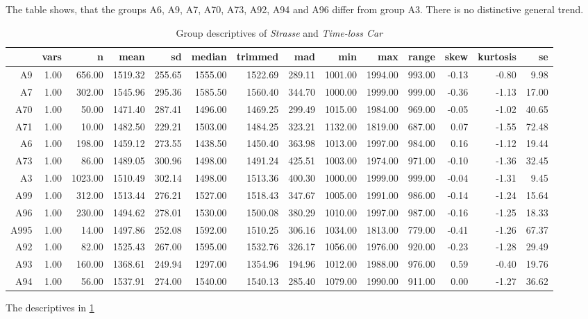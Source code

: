 The table shows, that the groups A6, A9, A7, A70, A73, A92, A94 and A96 differ from group A3. There is no distinctive general trend.
\begin{table}[ht!]
	\tiny
	\centering
	\begin{tabular}{rrrrrrrrrrrrrr}
		\hline
		& vars & n & mean & sd & median & trimmed & mad & min & max & range & skew & kurtosis & se \\ 
		\hline
		A9   & 1.00 & 656.00 & 1519.32 & 255.65 & 1555.00 & 1522.69 & 289.11 & 1001.00 & 1994.00 & 993.00 & -0.13 & -0.80 & 9.98 \\ 
		A7   & 1.00 & 302.00 & 1545.96 & 295.36 & 1585.50 & 1560.40 & 344.70 & 1000.00 & 1999.00 & 999.00 & -0.36 & -1.13 & 17.00 \\ 
		A70  & 1.00 & 50.00 & 1471.40 & 287.41 & 1496.00 & 1469.25 & 299.49 & 1015.00 & 1984.00 & 969.00 & -0.05 & -1.02 & 40.65 \\ 
		A71  & 1.00 & 10.00 & 1482.50 & 229.21 & 1503.00 & 1484.25 & 323.21 & 1132.00 & 1819.00 & 687.00 & 0.07 & -1.55 & 72.48 \\ 
		A6   & 1.00 & 198.00 & 1459.12 & 273.55 & 1438.50 & 1450.40 & 363.98 & 1013.00 & 1997.00 & 984.00 & 0.16 & -1.12 & 19.44 \\ 
		A73  & 1.00 & 86.00 & 1489.05 & 300.96 & 1498.00 & 1491.24 & 425.51 & 1003.00 & 1974.00 & 971.00 & -0.10 & -1.36 & 32.45 \\ 
		A3   & 1.00 & 1023.00 & 1510.49 & 302.14 & 1498.00 & 1513.36 & 400.30 & 1000.00 & 1999.00 & 999.00 & -0.04 & -1.31 & 9.45 \\ 
		A99  & 1.00 & 312.00 & 1513.44 & 276.21 & 1527.00 & 1518.43 & 347.67 & 1005.00 & 1991.00 & 986.00 & -0.14 & -1.24 & 15.64 \\ 
		A96  & 1.00 & 230.00 & 1494.62 & 278.01 & 1530.00 & 1500.08 & 380.29 & 1010.00 & 1997.00 & 987.00 & -0.16 & -1.25 & 18.33 \\ 
		A995 & 1.00 & 14.00 & 1497.86 & 252.08 & 1592.00 & 1510.25 & 306.16 & 1034.00 & 1813.00 & 779.00 & -0.41 & -1.26 & 67.37 \\ 
		A92  & 1.00 & 82.00 & 1525.43 & 267.00 & 1595.00 & 1532.76 & 326.17 & 1056.00 & 1976.00 & 920.00 & -0.23 & -1.28 & 29.49 \\ 
		A93  & 1.00 & 160.00 & 1368.61 & 249.94 & 1297.00 & 1354.96 & 194.96 & 1012.00 & 1988.00 & 976.00 & 0.59 & -0.40 & 19.76 \\ 
		A94  & 1.00 & 56.00 & 1537.91 & 274.00 & 1540.00 & 1540.13 & 285.40 & 1079.00 & 1990.00 & 911.00 & 0.00 & -1.27 & 36.62 \\ 
		\bottomrule
	\end{tabular}
	\caption{Group descriptives of \textit{Strasse} and \textit{Time-loss Car}}
	\label{tbl:descriptives_arbis_matched_Strasse_TLCar}
\end{table}
The descriptives in \cref{tbl:descriptives_arbis_matched_Strasse_TLCar}

